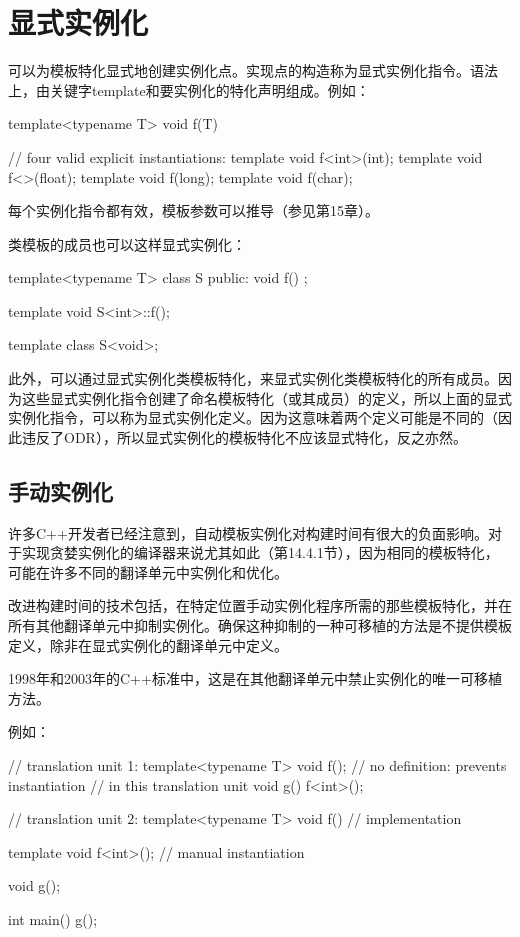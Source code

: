 \section{显式实例化}

可以为模板特化显式地创建实例化点。实现点的构造称为显式实例化指令。语法上，由关键字template和要实例化的特化声明组成。例如：

\begin{cpp}
template<typename T>
void f(T)
{ }

// four valid explicit instantiations:
template void f<int>(int);
template void f<>(float);
template void f(long);
template void f(char);
\end{cpp}

每个实例化指令都有效，模板参数可以推导（参见第15章）。

类模板的成员也可以这样显式实例化：

\begin{cpp}
template<typename T>
class S {
	public:
	void f() {
	}
};

template void S<int>::f();

template class S<void>;
\end{cpp}

此外，可以通过显式实例化类模板特化，来显式实例化类模板特化的所有成员。因为这些显式实例化指令创建了命名模板特化（或其成员）的定义，所以上面的显式实例化指令，可以称为显式实例化定义。因为这意味着两个定义可能是不同的（因此违反了ODR），所以显式实例化的模板特化不应该显式特化，反之亦然。

\subsection{手动实例化}

许多C++开发者已经注意到，自动模板实例化对构建时间有很大的负面影响。对于实现贪婪实例化的编译器来说尤其如此（第14.4.1节），因为相同的模板特化，可能在许多不同的翻译单元中实例化和优化。

改进构建时间的技术包括，在特定位置手动实例化程序所需的那些模板特化，并在所有其他翻译单元中抑制实例化。确保这种抑制的一种可移植的方法是不提供模板定义，除非在显式实例化的翻译单元中定义。

\begin{notice}
1998年和2003年的C++标准中，这是在其他翻译单元中禁止实例化的唯一可移植方法。
\end{notice}

例如：

\begin{cpp}
// translation unit 1:
template<typename T> void f(); // no definition: prevents instantiation
								// in this translation unit
void g()
{
	f<int>();
}

// translation unit 2:
template<typename T> void f()
{
	// implementation
}

template void f<int>(); // manual instantiation

void g();

int main()
{
	g();
}
\end{cpp}

